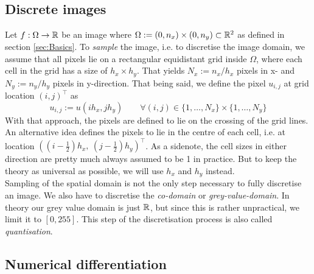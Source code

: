 \subsection{Discrete images}\label{sub:DiscreteImages}
Let $f:\Omega \rightarrow \mathbb{R}$ be an image where $\Omega
:= (0, n_x)\times(0, n_y) \subset \mathbb{R}^2$ as defined in section \ref{sec:Basics}. To
\textit{sample} the image, i.e. to discretise the image domain, we assume that all pixels lie on a
rectangular equidistant grid inside $\Omega$, where each cell in the grid has a size of $h_x
\times h_y$.
That yields $N_x := n_x/h_x$ pixels in x- and $N_y := n_y/h_y$ pixels in
y-direction.
That being said, we define the pixel $u_{i,j}$ at grid location $(i, j)^\top$ as
\begin{equation}
    u_{i, j} := u(ih_x, jh_y)\qquad \forall(i ,j) \in \{1,\dots,N_x\}\times\{1,\dots,N_y\}
\end{equation}
With that approach, the pixels are defined to lie on the crossing of the grid lines.
An alternative idea defines the pixels to lie in the centre of each cell, i.e. at location 
$((i-\frac{1}{2})h_x,\ (j- \frac{1}{2})h_y)^\top$.
As a sidenote, the cell sizes in either direction are pretty much always assumed to be 1 in 
practice. 
But to keep the theory as universal as possible, we will use $h_x$ and $h_y$ instead.\\
Sampling of the spatial domain is not the only step necessary to fully discretise an image. We also have
to discretise the \textit{co-domain} or \textit{grey-value-domain}. In theory our grey value domain
is just $\mathbb{R}$, but since this is rather unpractical, we limit it to $[0, 255]$. This step of
the discretisation process is also called \textit{quantisation}.

\subsection{Numerical differentiation}\label{sub:NumDiff}


